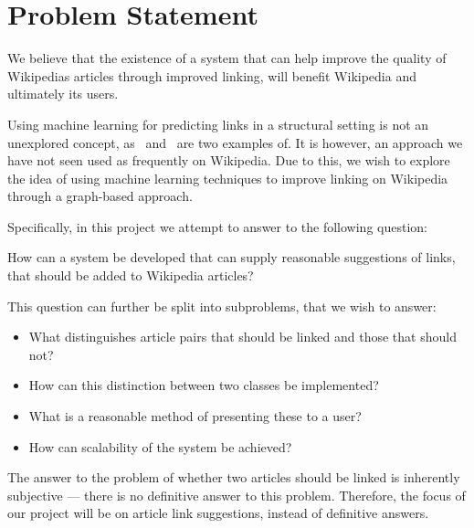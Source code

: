 \section{Problem Statement}\label{sec:problem_statement}
We believe that the existence of a system that can help improve the quality of Wikipedias articles through improved linking, will benefit Wikipedia and ultimately its users.

Using machine learning for predicting links in a structural setting is not an unexplored concept, as~\cite{tang2015line} and~\cite{al2006link} are two examples of. It is however, an approach we have not seen used as frequently on Wikipedia. Due to this, we wish to explore the idea of using machine learning techniques to improve linking on Wikipedia through a graph-based approach.

Specifically, in this project we attempt to answer to the following question:

\begin{formal}
How can a system be developed that can supply reasonable suggestions of links, that should be added to Wikipedia articles?
\end{formal}

This question can further be split into subproblems, that we wish to answer:
\begin{itemize}
  \item What distinguishes article pairs that should be linked and those that should not?
  \item How can this distinction between two classes be implemented?
  \item What is a reasonable method of presenting these to a user?
  \item How can scalability of the system be achieved?
\end{itemize}

The answer to the problem of whether two articles should be linked is inherently subjective --- there is no definitive answer to this problem. Therefore, the focus of our project will be on article link suggestions, instead of definitive answers.


